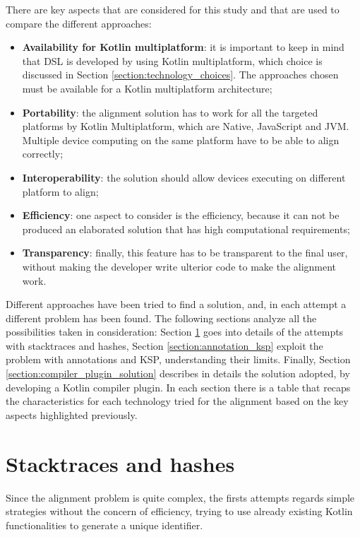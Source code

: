There are key aspects that are considered for this study and that are used to compare the different approaches:
\begin{itemize}
    \item \textbf{Availability for Kotlin multiplatform}: it is important to keep in mind that DSL is developed by using Kotlin multiplatform, which choice is discussed in Section \ref{section:technology_choices}. The approaches chosen must be available for a Kotlin multiplatform architecture;
    \item \textbf{Portability}: the alignment solution has to work for all the targeted platforms by Kotlin Multiplatform, which are Native, JavaScript and JVM. Multiple device computing on the same platform have to be able to align correctly;
    \item \textbf{Interoperability}: the solution should allow devices executing on different platform to align;
    \item \textbf{Efficiency}: one aspect to consider is the efficiency, because it can not be produced an elaborated solution that has high computational requirements;
    \item \textbf{Transparency}: finally, this feature has to be transparent to the final user, without making the developer write ulterior code to make the alignment work.
\end{itemize}

Different approaches have been tried to find a solution, and, in each attempt a different problem has been found. The following sections analyze all the possibilities taken in consideration: Section \ref{section:stacktraces_hashes} goes into details of the attempts with stacktraces and hashes, Section \ref{section:annotation_ksp} exploit the problem with annotations and KSP, understanding their limits. Finally, Section \ref{section:compiler_plugin_solution} describes in details the solution adopted, by developing a Kotlin compiler plugin. In each section there is a table that recaps the characteristics for each technology tried for the alignment based on the key aspects highlighted previously.

\section{Stacktraces and hashes}\label{section:stacktraces_hashes}
Since the alignment problem is quite complex, the firsts attempts regards simple strategies without the concern of efficiency, trying to use already existing Kotlin functionalities to generate a unique identifier.

